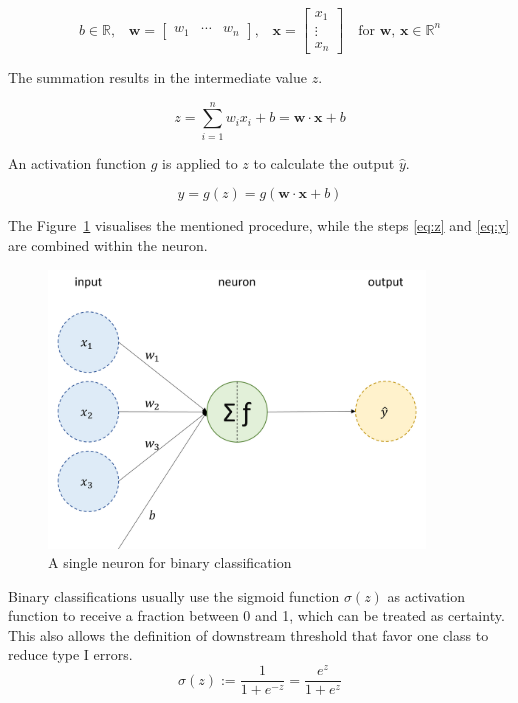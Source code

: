 \begin{equation}
    \text{$b \in \mathbb{R}$,}\quad\mathbf{w} = \begin{bmatrix}w_1&\cdots &w_n\end{bmatrix}\text{,}\quad\mathbf{x} = \begin{bmatrix}x_1\\\vdots \\x_n\end{bmatrix}\quad\text{for $\mathbf{w}$, $\mathbf{x} \in \mathbb{R}^n$}
\end{equation}

The summation results in the intermediate value $z$.

\begin{equation} \label{eq:z}
    z = \sum_{i=1}^n w_i x_i + b = \mathbf{w} \cdot \mathbf{x} + b
\end{equation}

An activation function $g$ is applied to $z$ to calculate the output $\hat{y}$.

\begin{equation} \label{eq:y}
\hat{y} = g(z) = g(\mathbf{w} \cdot \mathbf{x} + b)
\end{equation}

The Figure~\ref{fig:neuron} visualises the mentioned procedure, while the steps \ref{eq:z} and \ref{eq:y} are combined within the neuron.

\begin{figure}[H]
    \begin{center}
    \includegraphics[width=10cm]{../images/neuron.png}
    \caption{A single neuron for binary classification}\label{fig:neuron}
    \end{center}
\end{figure}

Binary classifications usually use the sigmoid function $\sigma(z)$ as activation function to receive a fraction between 0 and 1, which can be treated as certainty. This also allows the definition of downstream threshold that favor one class to reduce type I errors.
\begin{equation}
    \sigma(z) := \frac{1}{1+e^{-z}} = \frac{e^{z}}{1+e^{z}}
\end{equation}


